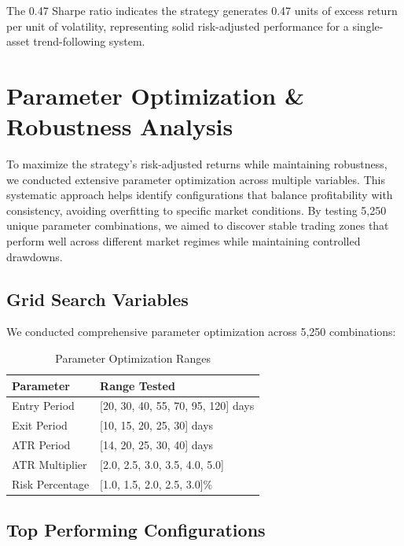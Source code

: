 \documentclass[11pt,a4paper]{article}
\begin{document}
\noindent The 0.47 Sharpe ratio indicates the strategy generates 0.47 units of excess return per unit of volatility, representing solid risk-adjusted performance for a single-asset trend-following system.

\section{Parameter Optimization \& Robustness Analysis}

To maximize the strategy's risk-adjusted returns while maintaining robustness, we conducted extensive parameter optimization across multiple variables. This systematic approach helps identify configurations that balance profitability with consistency, avoiding overfitting to specific market conditions. By testing 5,250 unique parameter combinations, we aimed to discover stable trading zones that perform well across different market regimes while maintaining controlled drawdowns. 


\subsection{Grid Search Variables}
We conducted comprehensive parameter optimization across 5,250 combinations:


\begin{table}[H]
\centering
\begin{tabular}{ll}
\toprule
\textbf{Parameter} & \textbf{Range Tested} \\
\midrule
Entry Period & [20, 30, 40, 55, 70, 95, 120] days \\
Exit Period & [10, 15, 20, 25, 30] days \\
ATR Period & [14, 20, 25, 30, 40] days \\
ATR Multiplier & [2.0, 2.5, 3.0, 3.5, 4.0, 5.0] \\
Risk Percentage & [1.0, 1.5, 2.0, 2.5, 3.0]\% \\
\bottomrule
\end{tabular}
\caption{Parameter Optimization Ranges}
\end{table}

\subsection{Top Performing Configurations}
\end{document}
